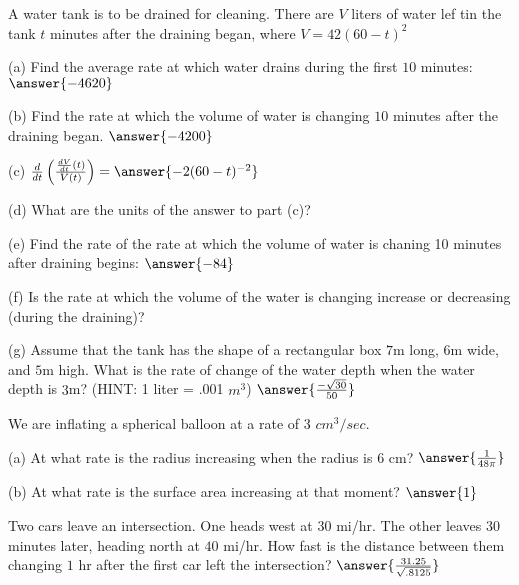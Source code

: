 \documentclass{ximera}
\begin{document}
\begin{exercise}
A water tank is to be drained for cleaning. There are $V$ liters of water lef tin the tank $t$ minutes after the draining began, where $V=42(60-t)^2$

(a) Find the average rate at which water drains during the first $10$ minutes: $\answer{-4620}$

(b) Find the rate at which the volume of water is changing $10$ minutes after the draining began. $\answer{-4200}$

(c) $\frac{d}{dt}\left(\frac{\frac{dV}{dt}(t)}{V(t)}\right)=\answer{-2(60-t)^{-2}}$

(d) What are the units of the answer to part (c)?

(e) Find the rate of the rate at which the volume of water is chaning 10 minutes after draining begins: $\answer{-84}$

(f) Is the rate at which the volume of the water is changing increase or decreasing (during the draining)? 
\begin{multipleChoice}
\end{multipleChoice}

(g) Assume that the tank has the shape of a rectangular box $7$m long, $6$m wide, and $5$m high. What is the rate of change of the water depth when the water depth is $3$m? (HINT: 1 liter = .001 $m^3$) $\answer{\frac{-\sqrt{30}}{50}}$

\end{exercise}

\begin{exercise}
We are inflating a spherical balloon at a rate of 3 $cm^3/sec$. 

(a) At what rate is the radius increasing when the radius is $6$ cm? $\answer{\frac{1}{48\pi}}$

(b) At what rate is the surface area increasing at that moment? $\answer{1}$
\end{exercise}

\begin{exercise}
Two cars leave an intersection. One heads west at $30$ mi/hr. The other leaves 30 minutes later, heading north at $40$ mi/hr. How fast is the distance between them changing $1$ hr after the first car left the intersection? $\answer{\frac{31.25}{\sqrt{.8125}}}$


\end{exercise}
\end{document}
